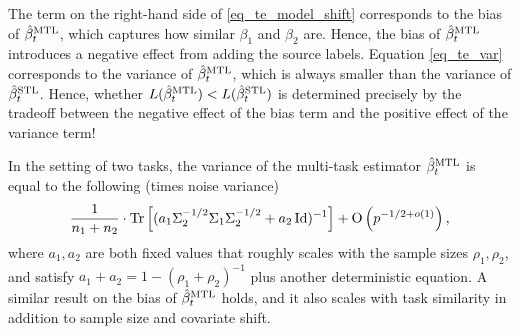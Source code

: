 The term on the right-hand side of \eqref{eq_te_model_shift} corresponds to the bias of $\hat{\beta}_t^{\text{MTL}}$, which captures how similar $\beta_1$ and $\beta_2$ are.
Hence, the bias of $\hat{\beta}_t^{\text{MTL}}$ introduces a negative effect from adding the source labels.
Equation \eqref{eq_te_var} corresponds to the variance of $\hat{\beta}_t^{\text{MTL}}$, which is always smaller than the variance of $\hat{\beta}_t^{\text{STL}}$.
Hence, whether $L(\hat{\beta}_t^{\text{MTL}}) < L(\hat{\beta}_t^{\text{STL}})$ is determined precisely by the tradeoff between the negative effect of the bias term and the positive effect of the variance term!

\begin{theorem}[Informal]\label{lem_cov_shift_informal}
	In the setting of two tasks,
	the variance of the multi-task estimator $\hat{\beta}_t^{\text{MTL}}$ is equal to  the following (times noise variance)
{\small\begin{align*}%
		\frac{1}{n_1+n_2}\cdot \bigtr{ (a_1 \Sigma_2^{-1/2}\Sigma_1\Sigma_2^{-1/2} + a_2\id)^{-1}} +\bigo{{p^{-1/2+o(1)}}},
	\end{align*}}%
where $a_1, a_2$ are both fixed values that roughly scales with the sample sizes $\rho_1, \rho_2$, and satisfy $a_1 + a_2 = 1 - (\rho_1 + \rho_2)^{-1}$ plus another deterministic equation.
A similar result on the bias of $\hat{\beta}_t^{\text{MTL}}$ holds, and it also scales with task similarity in addition to sample size and covariate shift.
\end{theorem}







